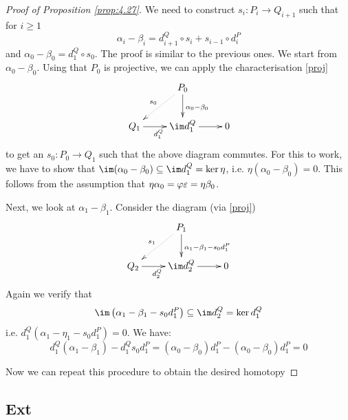 \documentclass[twoside = false,	%
		headsepline,		%
		parskip = true,
		]{scrbook}						%
\begin{document}
    \begin{proof}[Proof of Proposition \ref{prop:4.27}]
        We need to construct $s_i:P_i \to Q_{i+1}$ such that for $i \geq 1$
        \begin{equation*}
            \alpha_i - \beta_i = d_{i+1}^Q \circ s_i + s_{i-1} \circ d_i^P
        \end{equation*}
        and $\alpha_0 - \beta_ 0 = d_1^Q \circ s_0$. The proof is similar to the previous ones. We start from $\alpha_0 - \beta_0$. Using that $P_0$ is projective, we can apply the characterisation \ref{proj}
        \begin{equation*}
        \xymatrix {
            & P_0 \ar[d]^{\alpha_0 - \beta_0} \ar@{.>}[dl]_{s_0} \\
            Q_1 \ar[r]_{d_1^Q} & \im d_1^Q \ar[r] & 0
        }
        \end{equation*}
        to get an $s_0: P_0 \to Q_1$ such that the above diagram commutes. For this to work, we have to show that $\im (\alpha_0 - \beta_0) \subseteq \im d_1^Q = \ker \eta$, i.e. $\eta(\alpha_0 - \beta_0) = 0$. This follows from the assumption that $\eta \alpha_0 = \varphi \varepsilon = \eta \beta_0$.

        Next, we look at $\alpha_1 - \beta_1$. Consider the diagram (via \ref{proj})
        \begin{equation*}
        \xymatrix {
            & P_1 \ar[d]^{\alpha_1 - \beta_1 - s_0 d_1^P} \ar@{.>}[dl]_{s_1} \\
            Q_2 \ar[r]_{d_2^Q} & \im d_2^Q \ar[r] & 0
        }
        \end{equation*}
        Again we verify that
        \begin{equation*}
            \im \round{\alpha_1 - \beta_1 - s_0 d_1^P} \subseteq \im d_2^Q = \ker d_1^Q
        \end{equation*}
        i.e. $d_1^Q(\alpha_1 - \eta_1 - s_0 d_1^P) = 0$. We have:
        \begin{equation*}
            d_1^Q(\alpha_1 - \beta_1) - d_1^Q s_0 d_1^P = (\alpha_0 - \beta_0)d_1^P - (\alpha_0 - \beta_0) d_1^P = 0
        \end{equation*}

        Now we can repeat this procedure to obtain the desired homotopy
    \end{proof}

\subsection{Ext}

    
\printbibliography
\end{document}
